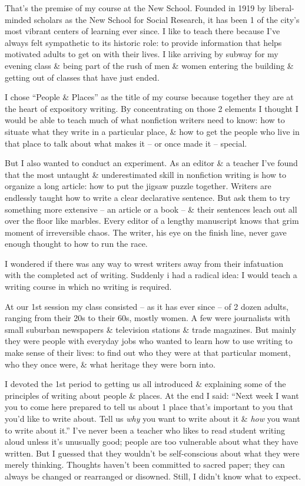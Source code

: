 \documentclass{article}
\numberwithin{equation}{section}
\begin{document}
That's the premise of my course at the New School. Founded in 1919 by liberal-minded scholars as the New School for Social Research, it has been 1 of the city's most vibrant centers of learning ever since. I like to teach there because I've always felt sympathetic to its historic role: to provide information that helps motivated adults to get on with their lives. I like arriving by subway for my evening class \& being part of the rush of men \& women entering the building \& getting out of classes that have just ended.

I chose ``People \& Places'' as the title of my course because together they are at the heart of expository writing. By concentrating on those 2 elements I thought I would be able to teach much of what nonfiction writers need to know: how to situate what they write in a particular place, \& how to get the people who live in that place to talk about what makes it -- or once made it -- special.

But I also wanted to conduct an experiment. As an editor \& a teacher I've found that the most untaught \& underestimated skill in nonfiction writing is how to organize a long article: how to put the jigsaw puzzle together. Writers are endlessly taught how to write a clear declarative sentence. But ask them to try something more extensive -- an article or a book -- \& their sentences leach out all over the floor like marbles. Every editor of a lengthy manuscript knows that grim moment of irreversible chaos. The writer, his eye on the finish line, never gave enough thought to how to run the race.

I wondered if there was any way to wrest writers away from their infatuation with the completed act of writing. Suddenly i had a radical idea: I would teach a writing course in which no writing is required.

At our 1st session my class consisted -- as it has ever since -- of 2 dozen adults, ranging from their 20s to their 60s, mostly women. A few were journalists with small suburban newspapers \& television stations \& trade magazines. But mainly they were people with everyday jobs who wanted to learn how to use writing to make sense of their lives: to find out who they were at that particular moment, who they once were, \& what heritage they were  born into.

I devoted the 1st period to getting us all introduced \& explaining some of the principles of writing about people \& places. At the end I said: ``Next week I want you to come here prepared to tell us about 1 place that's important to you that you'd like to write about. Tell us \textit{why} you want to write about it \& \textit{how} you want to write about it.'' I've never been a teacher who likes to read student writing aloud unless it's unusually good; people are too vulnerable about what they have written. But I guessed that they wouldn't be self-conscious about what they were merely thinking. Thoughts haven't been committed to sacred paper; they can always be changed or rearranged or disowned. Still, I didn't know what to expect.
\end{document}
